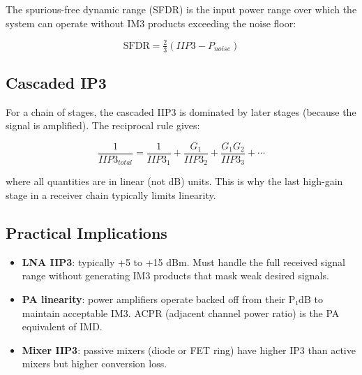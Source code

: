       

The spurious-free dynamic range (SFDR) is the input power range over which the system can operate without IM3 products exceeding the noise floor:

      
\[\text{SFDR} = \tfrac{2}{3}(IIP3 - P_{noise})\]

      

\subsection{Cascaded IP3}

      

For a chain of stages, the cascaded IIP3 is dominated by later stages (because the signal is amplified). The reciprocal rule gives:

      
\[\dfrac{1}{IIP3_{total}} = \dfrac{1}{IIP3_1} + \dfrac{G_1}{IIP3_2} + \dfrac{G_1 G_2}{IIP3_3} + \cdots\]

      

where all quantities are in linear (not dB) units. This is why the last high-gain stage in a receiver chain typically limits linearity.

      

\subsection{Practical Implications}

      
\begin{itemize}

        \item \textbf{LNA IIP3}: typically +5 to +15 dBm. Must handle the full received signal range without generating IM3 products that mask weak desired signals.

        \item \textbf{PA linearity}: power amplifiers operate backed off from their P₁dB to maintain acceptable IM3. ACPR (adjacent channel power ratio) is the PA equivalent of IMD.

        \item \textbf{Mixer IIP3}: passive mixers (diode or FET ring) have higher IP3 than active mixers but higher conversion loss.

      
\end{itemize}



